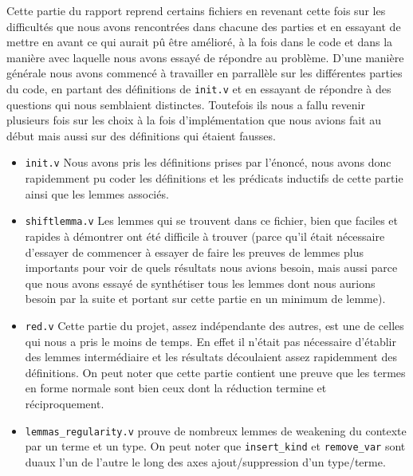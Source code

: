 Cette partie du rapport reprend certains fichiers en revenant cette fois sur les difficultés que nous avons rencontrées dans chacune des parties et en essayant de mettre en avant ce qui aurait pû être amélioré, à la fois dans le code et dans la manière avec laquelle nous avons essayé de répondre au problème. D'une manière générale nous avons commencé à travailler en parrallèle sur les différentes parties du code, en partant des définitions de \texttt{init.v} et en essayant de répondre à des questions qui nous semblaient distinctes. Toutefois ils nous a fallu revenir plusieurs fois sur les choix à la fois d'implémentation que nous avions fait au début mais aussi sur des définitions qui étaient fausses.
     \begin{itemize}
      \item \texttt{init.v} Nous avons pris les définitions prises par l'énoncé, nous avons donc rapidemment pu coder les définitions et les prédicats inductifs de cette partie ainsi que les lemmes associés.
      \item \texttt{shiftlemma.v} Les lemmes qui se trouvent dans ce fichier, bien que faciles et rapides à démontrer ont été difficile à trouver (parce qu'il était nécessaire d'essayer de commencer à essayer de faire les preuves de lemmes plus importants pour voir de quels résultats nous avions besoin, mais aussi parce que nous avons essayé de synthétiser tous les lemmes dont nous aurions besoin par la suite et portant sur cette partie en un minimum de lemme).
      \item \texttt{red.v} Cette partie du projet, assez indépendante des autres, est une de celles qui nous a pris le moins de temps. En effet il n'était pas nécessaire d'établir des lemmes intermédiaire et les résultats découlaient assez rapidemment des définitions. On peut noter que cette partie contient une preuve que les termes en forme normale sont bien ceux dont la réduction termine et réciproquement.
      \item {\tt lemmas\_regularity.v} prouve de nombreux lemmes de weakening du contexte par un terme et un type. On peut noter que {\tt insert\_kind} et {\tt remove\_var} sont duaux l'un de l'autre le long des axes ajout/suppression d'un type/terme.
     \end{itemize}
